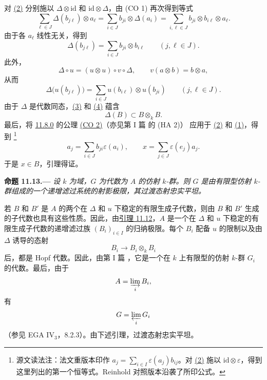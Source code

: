 对 \hyperref[form:sga3-VIB-11.12-eq2]{\textup{(2)}} 分别施以 \(\Delta\otimes\mathrm{id}\) 和 \(\mathrm{id}\otimes\Delta\)，由 \textup{(CO 1)} 再次得到等式
\[
  \sum_{\ell\in J}\Delta(b_{j\ell})\otimes a_\ell
  =
  \sum_{i\in J}b_{ji}\otimes\Delta(a_i)
  =
  \sum_{i,\ell\in J}b_{ji}\otimes b_{i\ell}\otimes a_\ell.
\]
由于各 \(a_\ell\) 线性无关，得到
\label{form:sga3-VIB-11.12-eq3}%
\[
  \tag{3}
  \Delta(b_{j\ell})
    =\sum_{i\in J}b_{ji}\otimes b_{i\ell}
  \qquad (j,\ell\in J).
\]
此外，
\[
  \Delta\circ u=(u\otimes u)\circ v\circ\Delta,
  \qquad v(a\otimes b)=b\otimes a,
\]
从而
\label{form:sga3-VIB-11.12-eq4}%
\[
  \tag{4}
  \Delta\bigl(u(b_{j\ell})\bigr)
    =\sum_{i\in J}u(b_{i\ell})\otimes u(b_{ji})
  \qquad (j,\ell\in J).
\]
由于 \(\Delta\) 是代数同态，\hyperref[form:sga3-VIB-11.12-eq3]{\textup{(3)}} 和 \hyperref[form:sga3-VIB-11.12-eq4]{\textup{(4)}} 蕴含
\[
  \Delta(B)\subset B\otimes_kB.
\]
最后，将 \hyperref[def:sga3-VIB-11.8.0]{11.8.0} 的公理 \hyperref[ax:sga3-VIB-11.8.0-CO2]{\textup{(CO 2)}}\textup{（亦见第 I 篇  的 \textup{(HA 2)}）} 应用于 \hyperref[form:sga3-VIB-11.12-eq2]{\textup{(2)}} 和 \hyperref[form:sga3-VIB-11.12-eq1]{\textup{(1)}}，得到%
\begingroup
\renewcommand{\thefootnote}{\fnsymbol{footnote}}%
\footnote[1]{\label{note:sga3-VIB-11.12-counit-source-reading}
源文读法注：法文重版本印作 \(a_j=\sum_{i\in I}\varepsilon(a_j)b_{ij}\)。对 \hyperref[form:sga3-VIB-11.12-eq2]{\textup{(2)}} 施以 \(\mathrm{id}\otimes\varepsilon\)，得到这里列出的第一个恒等式。Reinhold 对照版本沿袭了所印公式。}
\endgroup
{}\label{form:sga3-VIB-11.12-counit-identities}%
\[
  a_j=\sum_{i\in J}b_{ji}\varepsilon(a_i),
  \qquad
  x=\sum_{j\in J}\varepsilon(e_j)a_j.
\]
于是 \(x\in B\)，引理得证。

\medskip
{}\label{prop:sga3-VIB-11.13}%
\noindent\textbf{命题 11.13.---}
\emph{设 \(k\) 为域，\(G\) 为代数为 \(A\) 的仿射 \(k\)-群。则 \(G\) 是由有限型仿射 \(k\)-群组成的一个递增滤过系统的射影极限，其过渡态射忠实平坦。}

若 \(B\) 和 \(B'\) 是 \(A\) 的两个在 \(\Delta\) 和 \(u\) 下稳定的有限生成子代数，则由 \(B\) 和 \(B'\) 生成的子代数也具有这些性质。因此，由\hyperref[lem:sga3-VIB-11.12]{引理 11.12}，\(A\) 是一个在 \(\Delta\) 和 \(u\) 下稳定的有限生成子代数的递增滤过族 \((B_i)_{i\in I}\) 的归纳极限。每个 \(B_i\) 配备 \(u\) 的限制以及由 \(\Delta\) 诱导的态射
\[
  B_i\longrightarrow B_i\otimes_kB_i
\]
后，都是 Hopf 代数。因此，由第 I 篇 ，它是一个在 \(k\) 上有限型的仿射 \(k\)-群 \(G_i\) 的代数。最后，由于
\[
  A=\varinjlim_i B_i,
\]
有
\[
  G=\varprojlim_i G_i
\]
\textup{（参见 EGA IV\(_3\)，8.2.3）}。由下述引理，过渡态射忠实平坦。

